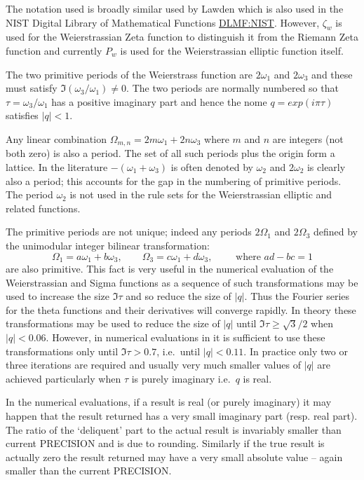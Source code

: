 The notation used is broadly similar used by Lawden \cite{Lawden:89} which is also used in the
NIST Digital Library of Mathematical Functions \href{https://dlmf.nist.gov/}{DLMF:NIST}. However,
$\zeta_w$ is used for the Weierstrassian Zeta function to distinguish it from the Riemann Zeta
function and currently $P_w$ is used for the Weierstrassian elliptic function itself.

The two primitive periods of the Weierstrass function are $2\omega_1$ and $2\omega_3$ and these must satisfy
$\Im(\omega_3/\omega_1) \neq 0$. The two periods are normally numbered so that $\tau = \omega_3/\omega_1$ has
a positive imaginary part and hence the nome $q = exp(i\pi\tau)$ satisfies $|q| <1$.

Any linear combination $\Omega_{m,n} = 2m\omega_1 +2n\omega_3$ where $m$ and $n$ are
integers (not both zero) is also a period. The set of all such periods plus the origin form a lattice. In the literature
$-(\omega_1+\omega_3)$ is often denoted by $\omega_2$ and $2\omega_2$ is clearly also a period; this
accounts for the gap in the numbering of primitive periods. The period $\omega_2$ is not used in \REDUCE the rule sets for
the Weierstrassian elliptic and related functions.

The primitive periods are not unique;
indeed any periods $2\Omega_1$ and $2\Omega_3$ defined by the unimodular integer bilinear transformation:
\[\Omega_1 = a\omega_1 + b\omega_3,\qquad\Omega_3 = c\omega_1 + d\omega_3,\qquad\text{ where }ad-bc = 1\]
are also primitive. This fact is very useful in the numerical evaluation of the Weierstrassian and Sigma
functions as a sequence of such transformations may be used to increase the size $\Im \tau$ and so reduce
the size of $|q|$. Thus the Fourier series for the theta functions and their derivatives will converge rapidly.
In theory these transformations may be used to reduce the size of $|q|$ until $\Im \tau \geq \sqrt 3/2$ when
$|q|<0.06$. However, in numerical evaluations in \REDUCE it is sufficient to use these transformations only until
$\Im \tau > 0.7$, i.e.~until $|q| < 0.11$. In practice only two or three iterations are required
and usually very much smaller values of $|q|$ are achieved particularly when $\tau$ is purely imaginary i.e.~$q$ is real.

In the numerical evaluations, if a result is real (or purely imaginary) it may
happen that the result returned has a very small imaginary part
(resp. real part). The ratio of the `deliquent' part to the actual result is
invariably smaller than current PRECISION and is due to rounding. Similarly if
the true result is actually zero the result returned may have a very small
absolute value -- again smaller than the current PRECISION.

